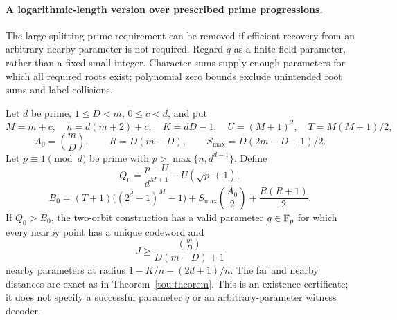 \paragraph{A logarithmic-length version over prescribed prime progressions.}
The large splitting-prime requirement can be removed if efficient recovery
from an arbitrary nearby parameter is not required. Regard $q$ as a
finite-field parameter, rather than a fixed small integer. Character sums
supply enough parameters for which all required roots exist; polynomial
zero bounds exclude unintended root sums and label collisions.

\begin{lemma}\label{tou:finite}
Let $d$ be prime, $1\le D<m$, $0\le c<d$, and put
\[
 M=m+c,\quad n=d(m+2)+c,\quad K=dD-1,\quad
 U=(M+1)^2,\quad T=M(M+1)/2,
\]
\[
 A_0=\binom mD,\qquad R=D(m-D),\qquad
 S_{\max}=D(2m-D+1)/2.
\]
Let $p\equiv1\pmod d$ be prime with $p>\max\{n,d^{d-1}\}$.
Define
\[
 Q_0=\frac{p-U}{d^{M+1}}-U(\sqrt p+1),
\]
\[
 B_0=(T+1)\bigl((2^d-1)^M-1\bigr)
       +S_{\max}\binom{A_0}{2}+\frac{R(R+1)}2.
\]
If $Q_0>B_0$, the two-orbit construction has a valid parameter
$q\in\mathbb F_p$ for which every nearby point has a unique codeword and
\[
 J\ge\frac{\binom mD}{D(m-D)+1}
\]
nearby parameters at radius $1-K/n-(2d+1)/n$.
The far and nearby distances are exact as in Theorem~\ref{tou:theorem}.
This is an existence certificate; it does not specify a successful
parameter $q$ or an arbitrary-parameter witness decoder.
\end{lemma}
